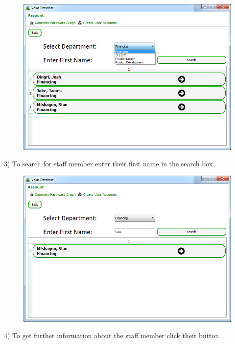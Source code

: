 \begin{figure}[H]
    \includegraphics[width=\textwidth]{./Manual/Images/searchdep2.png}
\end{figure}

3) To search for staff member enter their first name in the search box

\begin{figure}[H]
    \includegraphics[width=\textwidth]{./Manual/Images/searchdep3.png}
\end{figure}

4) To get further information about the staff member click their button

